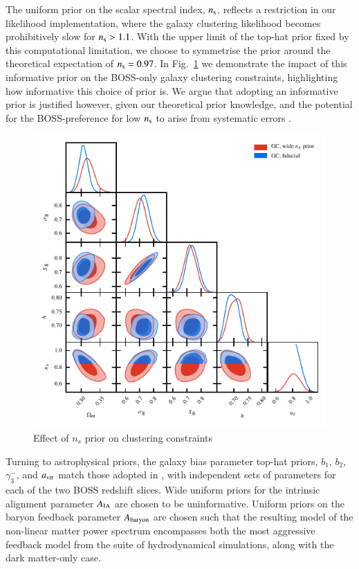 \begin{appendix}
The uniform prior on the scalar spectral index, $n_{\rm s}$, reflects a restriction in our likelihood implementation, where the \citet{sanchez/etal:2017} galaxy clustering likelihood becomes prohibitively slow for $n_{\rm s}>1.1$.  With the upper limit of the top-hat prior fixed by this computational limitation, we choose to symmetrise the prior around the theoretical expectation of $n_{\rm s}=0.97$.     In Fig.~\ref{fig:ns-prior} we demonstrate the impact of this informative prior on the BOSS-only galaxy clustering constraints, highlighting how informative this choice of prior is.   We argue that adopting an informative prior is justified however, given our theoretical prior knowledge, and the potential for the BOSS-preference for low $n_{\rm s}$ to arise from systematic errors \citep{ross/etal:2017}.   

\begin{figure}
	\begin{center}
		\includegraphics[width=\columnwidth]{Parameter_Plots/systematics/GC_ns_prior}
		\caption{Effect of $n_{s}$ prior on clustering constraints}
		\label{fig:ns-prior}
	\end{center}
\end{figure}

Turning to astrophysical priors, the galaxy bias parameter top-hat priors, $b_1$, $b_2$,  $\gamma_3^-$, and $a_{\rm vir}$ match those adopted in \citet{sanchez/etal:2017}, with independent sets of parameters for each of the two BOSS redshift slices.   Wide uniform priors for the intrinsic alignment parameter $A_{\rm IA}$ are chosen to be uninformative.    Uniform priors on the baryon feedback parameter $A_{\rm baryon}$ are chosen such that the resulting \citet{mead/etal:2015} model of the non-linear matter power spectrum encompasses both the most aggressive feedback model from the \citet{vandaalen/etal:2011} suite of hydrodynamical simulations, along with the dark matter-only case.


\end{appendix}
